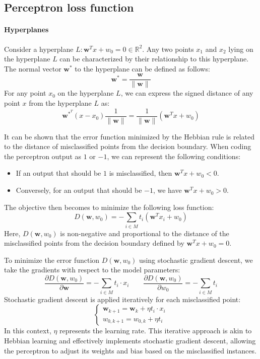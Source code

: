 \subsection{Perceptron loss function}
\paragraph*{Hyperplanes}
Consider a hyperplane $L:\mathbf{w}^T x + w_0 = 0 \in \mathbb{R}^2$. 
Any two points $x_1$ and $x_2$ lying on the hyperplane $L$ can be characterized by their relationship to this hyperplane.
The normal vector $\mathbf{w}^\ast$ to the hyperplane can be defined as follows:
\[\mathbf{w}^\ast = \dfrac{\mathbf{w}}{\|\mathbf{w}\|}\]
For any point $x_0$ on the hyperplane $L$, we can express the signed distance of any point $x$ from the hyperplane $L$ as:
\[\mathbf{w}^{\ast^T} (x - x_0)\dfrac{1}{\|\mathbf{w}\|} = \dfrac{1}{\|\mathbf{w}\|} \left( \mathbf{w}^T x + w_0 \right)\]

It can be shown that the error function minimized by the Hebbian rule is related to the distance of misclassified points from the decision boundary. 
When coding the perceptron output as $1$ or $-1$, we can represent the following conditions:
\begin{itemize}
    \item If an output that should be $1$ is misclassified, then $\mathbf{w}^T x + w_0 < 0$.
    \item Conversely, for an output that should be $-1$, we have $\mathbf{w}^T x + w_0 > 0$.
\end{itemize}
The objective then becomes to minimize the following loss function:
\[D(\mathbf{w}, w_0) = -\sum_{i \in M} t_i (\mathbf{w}^T x_i + w_0)\]
Here, $D(\mathbf{w}, w_0)$ is non-negative and proportional to the distance of the misclassified points from the decision boundary defined by $\mathbf{w}^T x + w_0 = 0$.

To minimize the error function $D(\mathbf{w}, w_0)$ using stochastic gradient descent, we take the gradients with respect to the model parameters:
\[\dfrac{\partial D(\mathbf{w}, w_0)}{\partial \mathbf{w}} = -\sum_{i \in M} t_i \cdot x_i\qquad\dfrac{\partial D(\mathbf{w}, w_0)}{\partial w_0} = -\sum_{i \in M} t_i\]
Stochastic gradient descent is applied iteratively for each misclassified point:
\[\begin{cases}
    \mathbf{w}_{k+1} = \mathbf{w}_k + \eta t_i \cdot x_i \\
    w_{0,k+1} = w_{0,k} + \eta t_i
\end{cases}\]
In this context, $\eta$ represents the learning rate. 
This iterative approach is akin to Hebbian learning and effectively implements stochastic gradient descent, allowing the perceptron to adjust its weights and bias based on the misclassified instances.


